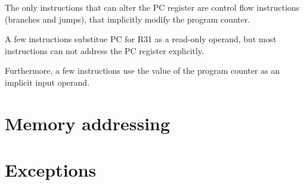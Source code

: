The only instructions that can alter the PC register are control flow
instructions (branches and jumps), that implicitly modify the program counter.

A few instructions substitue PC for R31 as a read-only operand, but most
instructions can not address the PC register explicitly.

Furthermore, a few instructions use the value of the program counter as an
implicit input operand.

\section{Memory addressing}

\tbd

\section{Exceptions}

\tbd
